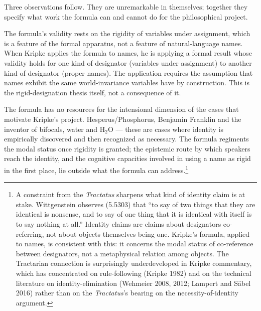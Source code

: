 \documentclass[10pt]{article}
\begin{document}
Three observations follow. They are unremarkable in themselves; together they specify what work the formula can and cannot do for the philosophical project.

The formula's validity rests on the rigidity of variables under assignment, which is a feature of the formal apparatus, not a feature of natural-language names. When Kripke applies the formula to names, he is applying a formal result whose validity holds for one kind of designator (variables under assignment) to another kind of designator (proper names). The application requires the assumption that names exhibit the same world-invariance variables have by construction. This is the rigid-designation thesis itself, not a consequence of it.

The formula has no resources for the intensional dimension of the cases that motivate Kripke's project. Hesperus/Phosphorus, Benjamin Franklin and the inventor of bifocals, water and H\(_2\)O --- these are cases where identity is empirically discovered and then recognized as necessary. The formula regiments the modal status once rigidity is granted; the epistemic route by which speakers reach the identity, and the cognitive capacities involved in using a name as rigid in the first place, lie outside what the formula can address.\footnote{A constraint from the \emph{Tractatus} sharpens what kind of identity claim is at stake. Wittgenstein observes (5.5303) that ``to say of two things that they are identical is nonsense, and to say of one thing that it is identical with itself is to say nothing at all.'' Identity claims are claims about designators co-referring, not about objects themselves being one. Kripke's formula, applied to names, is consistent with this: it concerns the modal status of co-reference between designators, not a metaphysical relation among objects. The Tractarian connection is surprisingly underdeveloped in Kripke commentary, which has concentrated on rule-following (Kripke 1982) and on the technical literature on identity-elimination (Wehmeier 2008, 2012; Lampert and Säbel 2016) rather than on the \emph{Tractatus}'s bearing on the necessity-of-identity argument.}
\end{document}
